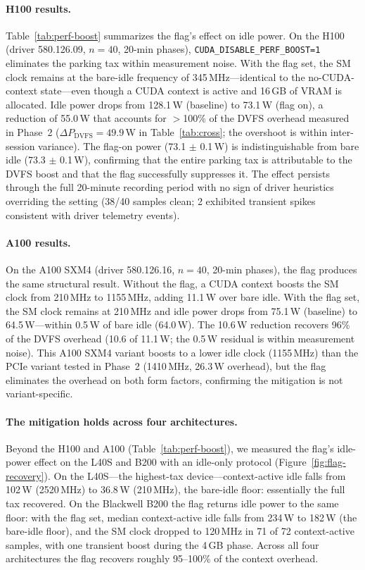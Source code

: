 \documentclass[sigconf,nonacm]{acmart}
\newcommand{\perfboost}{\texttt{CUDA\_\hspace{0pt}DISABLE\_\hspace{0pt}PERF\_\hspace{0pt}BOOST}}
\begin{document}
\paragraph{H100 results.} Table~\ref{tab:perf-boost} summarizes the flag's effect on idle power. On the H100 (driver 580.126.09, $n=40$, 20-min phases), \perfboost\texttt{=1} eliminates the parking tax within measurement noise. With the flag set, the SM clock remains at the bare-idle frequency of 345\,MHz---identical to the no-CUDA-context state---even though a CUDA context is active and 16\,GB of VRAM is allocated. Idle power drops from 128.1\,W (baseline) to 73.1\,W (flag on), a reduction of 55.0\,W that accounts for $>$100\% of the DVFS overhead measured in Phase~2 ($\Delta P_{\text{DVFS}} = 49.9$\,W in Table~\ref{tab:cross}; the overshoot is within inter-session variance). The flag-on power (73.1 $\pm$ 0.1\,W) is indistinguishable from bare idle (73.3 $\pm$ 0.1\,W), confirming that the entire parking tax is attributable to the DVFS boost and that the flag successfully suppresses it. The effect persists through the full 20-minute recording period with no sign of driver heuristics overriding the setting (38/40 samples clean; 2 exhibited transient spikes consistent with driver telemetry events).

\paragraph{A100 results.} On the A100 SXM4 (driver 580.126.16, $n=40$, 20-min phases), the flag produces the same structural result. Without the flag, a CUDA context boosts the SM clock from 210\,MHz to 1155\,MHz, adding 11.1\,W over bare idle. With the flag set, the SM clock remains at 210\,MHz and idle power drops from 75.1\,W (baseline) to 64.5\,W---within 0.5\,W of bare idle (64.0\,W). The 10.6\,W reduction recovers 96\% of the DVFS overhead (10.6 of 11.1\,W; the 0.5\,W residual is within measurement noise). This A100 SXM4 variant boosts to a lower idle clock (1155\,MHz) than the PCIe variant tested in Phase~2 (1410\,MHz, 26.3\,W overhead), but the flag eliminates the overhead on both form factors, confirming the mitigation is not variant-specific.

\paragraph{The mitigation holds across four architectures.} Beyond the H100 and A100 (Table~\ref{tab:perf-boost}), we measured the flag's idle-power effect on the L40S and B200 with an idle-only protocol (Figure~\ref{fig:flag-recovery}). On the L40S---the highest-tax device---context-active idle falls from 102\,W (2520\,MHz) to 36.8\,W (210\,MHz), the bare-idle floor: essentially the full tax recovered. On the Blackwell B200 the flag returns idle power to the same floor: with the flag set, median context-active idle falls from 234\,W to 182\,W (the bare-idle floor), and the SM clock dropped to 120\,MHz in 71 of 72 context-active samples, with one transient boost during the 4\,GB phase. Across all four architectures the flag recovers roughly 95--100\% of the context overhead.
\end{document}
